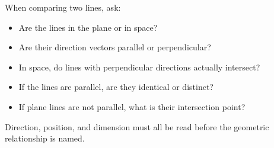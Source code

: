 \begin{summarybox}
When comparing two lines, ask:
\begin{itemize}
\item Are the lines in the plane or in space?
\item Are their direction vectors parallel or perpendicular?
\item In space, do lines with perpendicular directions actually intersect?
\item If the lines are parallel, are they identical or distinct?
\item If plane lines are not parallel, what is their intersection point?
\end{itemize}
\end{summarybox}

Direction, position, and dimension must all be read before the geometric relationship is named.
